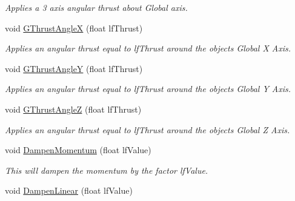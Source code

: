 \begin{DoxyCompactItemize}
\begin{DoxyCompactList}\small\item\em Applies a 3 axis angular thrust about Global axis. \end{DoxyCompactList}\item 
\hypertarget{classc_momentum_a0ef0aa6ac876af22bee53e282afefb08}{
void \hyperlink{classc_momentum_a0ef0aa6ac876af22bee53e282afefb08}{GThrustAngleX} (float lfThrust)}
\label{classc_momentum_a0ef0aa6ac876af22bee53e282afefb08}

\begin{DoxyCompactList}\small\item\em Applies an angular thrust equal to lfThrust around the objects Global X Axis. \end{DoxyCompactList}\item 
\hypertarget{classc_momentum_a827f3bb427dd88bac9f6c80979d07b45}{
void \hyperlink{classc_momentum_a827f3bb427dd88bac9f6c80979d07b45}{GThrustAngleY} (float lfThrust)}
\label{classc_momentum_a827f3bb427dd88bac9f6c80979d07b45}

\begin{DoxyCompactList}\small\item\em Applies an angular thrust equal to lfThrust around the objects Global Y Axis. \end{DoxyCompactList}\item 
\hypertarget{classc_momentum_aac5e91e4596061bdd1a21acf7feee224}{
void \hyperlink{classc_momentum_aac5e91e4596061bdd1a21acf7feee224}{GThrustAngleZ} (float lfThrust)}
\label{classc_momentum_aac5e91e4596061bdd1a21acf7feee224}

\begin{DoxyCompactList}\small\item\em Applies an angular thrust equal to lfThrust around the objects Global Z Axis. \end{DoxyCompactList}\item 
\hypertarget{classc_momentum_a7568fcd711837d2e0b1b90d19fa5069a}{
void \hyperlink{classc_momentum_a7568fcd711837d2e0b1b90d19fa5069a}{DampenMomentum} (float lfValue)}
\label{classc_momentum_a7568fcd711837d2e0b1b90d19fa5069a}

\begin{DoxyCompactList}\small\item\em This will dampen the momentum by the factor lfValue. \end{DoxyCompactList}\item 
\hypertarget{classc_momentum_abf82f78ae14d7953be37fc13f066babc}{
void \hyperlink{classc_momentum_abf82f78ae14d7953be37fc13f066babc}{DampenLinear} (float lfValue)}
\label{classc_momentum_abf82f78ae14d7953be37fc13f066babc}


\end{DoxyCompactItemize}
